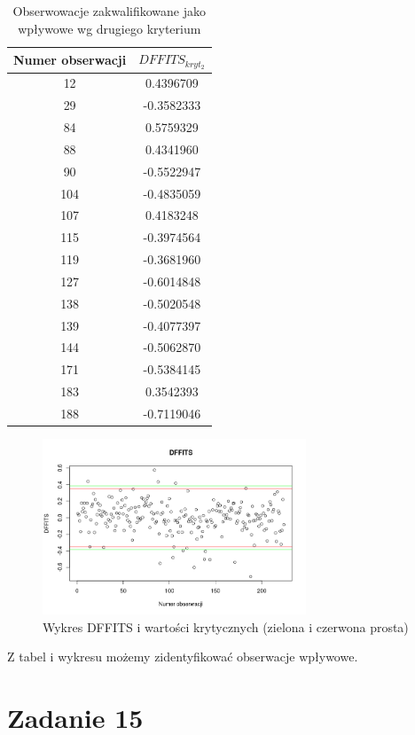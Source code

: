 \documentclass[9pt]{article}  %
\begin{document}
  \begin{table}[H]
  \centering
  \begin{tabular}{c|c}
     Numer obserwacji &  $DFFITS_{kryt_2 }$ \\ \hline
     12 & 0.4396709 \\
     29& -0.3582333  \\
     84& 0.5759329  \\
     88& 0.4341960 \\
     90& -0.5522947 \\
     104& -0.4835059  \\
     107& 0.4183248 \\
     115& -0.3974564 \\
     119& -0.3681960 \\
     127& -0.6014848 \\
     138& -0.5020548 \\
     139& -0.4077397 \\
     144& -0.5062870 \\
     171& -0.5384145  \\
     183& 0.3542393 \\
     188& -0.7119046 \\
  \end{tabular} 
  \caption{Obserwowacje zakwalifikowane jako wpływowe wg drugiego kryterium}
  \end{table}
  

    \begin{figure}[H]
      \centering
      \includegraphics[width=0.7\textwidth]{14.png}
      \caption{Wykres DFFITS i wartości krytycznych (zielona i czerwona prosta)}
    \end{figure} 

Z tabel i wykresu możemy zidentyfikować obserwacje wpływowe.



\section{Zadanie 15}
\end{document}
